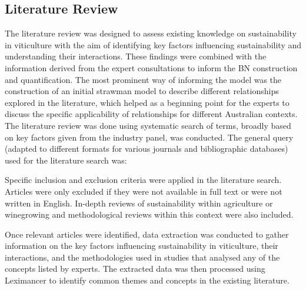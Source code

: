 \documentclass[fleqn,10pt]{wlscirep}
\begin{document}
\subsection*{Literature Review}

The literature review was designed to assess existing knowledge on sustainability in viticulture with the aim of identifying key factors influencing sustainability and understanding their interactions. These findings were combined with the information derived from the expert consultations to inform the BN construction and quantification. The most prominent way of informing the model was the construction of an initial strawman model to describe different relationships explored in the literature, which helped as a beginning point for the experts to discuss the specific applicability of relationships for different Australian contexts. The literature review was done using systematic search of terms, broadly based on key factors given from the industry panel, was conducted. The general query (adapted to different formats for various journals and bibliographic databases) used for the literature search was: 


Specific inclusion and exclusion criteria were applied in the literature search. Articles were only excluded if they were not available in full text or were not written in English. In-depth reviews of sustainability within agriculture or winegrowing and methodological reviews within this context were also included.

Once relevant articles were identified, data extraction was conducted to gather information on the key factors influencing sustainability in viticulture, their interactions, and the methodologies used in studies that analysed any of the concepts listed by experts. The extracted data was then processed using Leximancer to identify common themes and concepts in the existing literature.
\end{document}
